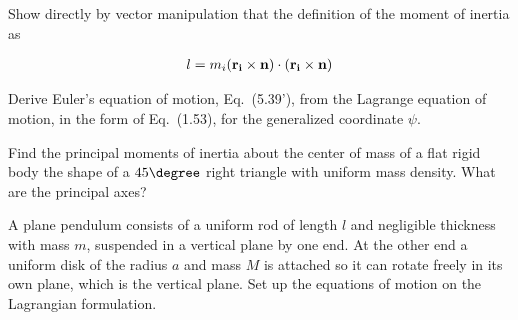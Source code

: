 \documentclass{bachw}
\begin{document}
\solution{}


Show directly by vector manipulation that the definition of the moment of inertia as

\begin{align}
  l = m_i(\bf{r}_i \times \bf{n}) \cdot ( \bf{r}_i \times \bf{n})
\end{align}

\solution{}

Derive Euler's equation of motion, Eq.\ (5.39'), from the Lagrange equation of motion, in the form of Eq.\ (1.53), for the generalized coordinate $\psi$.

\solution{}


Find the principal moments of inertia about the center of mass of a flat rigid body the shape of a $45\degree$ right triangle with uniform mass density.  What are the principal axes?

\solution{}

A plane pendulum consists of a uniform rod of length $l$ and negligible thickness with mass $m$, suspended in a vertical plane by one end.  At the other end a uniform disk of the radius $a$ and mass $M$ is attached so it can rotate freely in its own plane, which is the vertical plane.  Set up the equations of motion on the Lagrangian formulation. 

\solution{}
\end{document}
